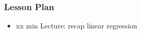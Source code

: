 \begin{frame}
    \frametitle{Lesson Plan}
    \begin{itemize}
        \item xx min Lecture: recap linear regression
     \end{itemize}
\end{frame}

    
